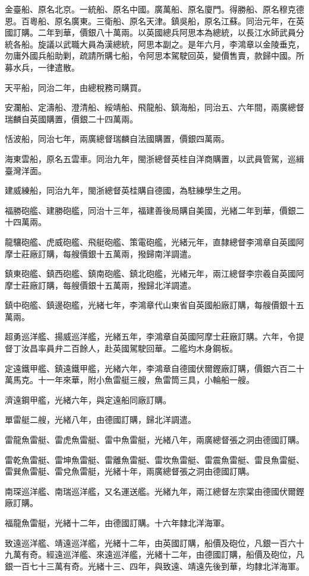 \begin{pinyinscope}
金臺船、原名北京。一統船、原名中國。廣萬船、原名廈門。得勝船、原名穆克德恩。百粵船、原名廣東。三衛船、原名天津。鎮吳船，原名江蘇。同治元年，在英國訂購。二年到華，價銀八十萬兩。以英國總兵阿思本為總統，以長江水師武員分統各船。旋議以武職大員為漢總統，阿思本副之。是年六月，李鴻章以金陵垂克，勿庸外國兵船助剿，疏請所購七船，令阿思本駕駛回英，變價售賣，款歸中國。所募水兵，一律遣散。

天平船，同治二年，由總稅務司購買。

安瀾船、定濤船、澄清船、綏靖船、飛龍船、鎮海船，同治五、六年間，兩廣總督瑞麟自英國購置，價銀二十四萬兩。

恬波船，同治七年，兩廣總督瑞麟自法國購置，價銀四萬兩。

海東雲船，原名五雲車。同治九年，閩浙總督英桂自洋商購置，以武員管駕，巡緝臺灣洋面。

建威練船，同治九年，閩浙總督英桂購自德國，為駐練學生之用。

福勝砲艦、建勝砲艦，同治十三年，福建善後局購自美國，光緒二年到華，價銀二十四萬兩。

龍驤砲艦、虎威砲艦、飛艇砲艦、策電砲艦，光緒元年，直隸總督李鴻章自英國阿摩士莊廠訂購，每艘價銀十五萬兩，撥歸南洋調遣。

鎮東砲艦、鎮西砲艦、鎮南砲艦、鎮北砲艦，光緒元年，兩江總督李宗羲自英國阿摩士莊廠訂購，每艘價銀十五萬兩，撥歸北洋調遣。

鎮中砲艦、鎮邊砲艦，光緒七年，李鴻章代山東省自英國船廠訂購，每艘價銀十五萬兩。

超勇巡洋艦、揚威巡洋艦，光緒五年，李鴻章自英國阿摩士莊廠訂購。六年，令提督丁汝昌率員弁二百餘人，赴英國駕駛回華。二艦均木身鋼板。

定遠鐵甲艦、鎮遠鐵甲艦，光緒六年，李鴻章自德國伏爾鏗廠訂購，價銀六百二十萬馬克。十一年來華，附小魚雷艇三艘，魚雷筒三具，小輪船一艘。

濟遠鋼甲艦，光緒六年，與定遠船同廠訂購。

單雷艇二艘，光緒八年，由德國訂購，歸北洋調遣。

雷龍魚雷艇、雷虎魚雷艇、雷中魚雷艇，光緒八年，兩廣總督張之洞由德國訂購。

雷乾魚雷艇、雷坤魚雷艇、雷離魚雷艇、雷坎魚雷艇、雷震魚雷艇、雷艮魚雷艇、雷巽魚雷艇、雷兌魚雷艇，光緒十年，兩廣總督張之洞由德國訂購。

南琛巡洋艦、南瑞巡洋艦，又名運送艦。光緒九年，兩江總督左宗棠由德國伏爾鏗廠訂購。

福龍魚雷艇，光緒十二年，由德國訂購。十六年隸北洋海軍。

致遠巡洋艦、靖遠巡洋艦，光緒十二年，由英國訂購，船價及砲位，凡銀一百六十九萬有奇。經遠巡洋艦、來遠巡洋艦，光緒十二年，由德國訂購，船價及砲位，凡銀一百七十三萬有奇。光緒十三、四年，與致遠、靖遠先後到華，均隸北洋海軍。


\end{pinyinscope}
